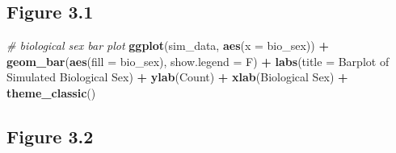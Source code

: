 \documentclass[
]{book}
\newenvironment{Shaded}{\begin{snugshade}}{\end{snugshade}}
\newcommand{\AttributeTok}[1]{\textcolor[rgb]{0.13,0.29,0.53}{#1}}
\newcommand{\CommentTok}[1]{\textcolor[rgb]{0.56,0.35,0.01}{\textit{#1}}}
\newcommand{\FunctionTok}[1]{\textcolor[rgb]{0.13,0.29,0.53}{\textbf{#1}}}
\newcommand{\NormalTok}[1]{#1}
\newcommand{\SpecialCharTok}[1]{\textcolor[rgb]{0.81,0.36,0.00}{\textbf{#1}}}
\newcommand{\StringTok}[1]{\textcolor[rgb]{0.31,0.60,0.02}{#1}}
\begin{document}
\subsection{Figure 3.1}\label{figure-3.1}

\begin{Shaded}
\begin{Highlighting}[]
\CommentTok{\# biological sex bar plot}
\FunctionTok{ggplot}\NormalTok{(sim\_data, }\FunctionTok{aes}\NormalTok{(}\AttributeTok{x =}\NormalTok{ bio\_sex)) }\SpecialCharTok{+}
  \FunctionTok{geom\_bar}\NormalTok{(}\FunctionTok{aes}\NormalTok{(}\AttributeTok{fill =}\NormalTok{ bio\_sex), }\AttributeTok{show.legend =}\NormalTok{ F) }\SpecialCharTok{+} 
  \FunctionTok{labs}\NormalTok{(}\AttributeTok{title =} \StringTok{\textquotesingle{}Barplot of Simulated Biological Sex\textquotesingle{}}\NormalTok{) }\SpecialCharTok{+}
  \FunctionTok{ylab}\NormalTok{(}\StringTok{\textquotesingle{}Count\textquotesingle{}}\NormalTok{) }\SpecialCharTok{+} \FunctionTok{xlab}\NormalTok{(}\StringTok{\textquotesingle{}Biological Sex\textquotesingle{}}\NormalTok{) }\SpecialCharTok{+}
  \FunctionTok{theme\_classic}\NormalTok{()}
\end{Highlighting}
\end{Shaded}

\subsection{Figure 3.2}\label{figure-3.2}
\end{document}
